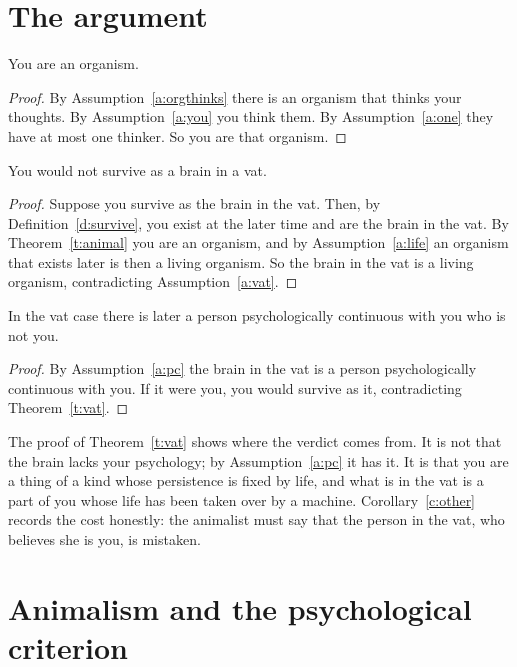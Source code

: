 \documentclass{situationist-preprint}
\begin{document}
\section{The argument}\label{s:arg}

\begin{theorem}\label{t:animal}
You are an organism.
\end{theorem}

\begin{proof}
By Assumption~\ref{a:orgthinks} there is an organism that thinks your thoughts. By Assumption~\ref{a:you} you think them. By Assumption~\ref{a:one} they have at most one thinker. So you are that organism.
\end{proof}

\begin{theorem}\label{t:vat}
You would not survive as a brain in a vat.
\end{theorem}

\begin{proof}
Suppose you survive as the brain in the vat. Then, by Definition~\ref{d:survive}, you exist at the later time and are the brain in the vat. By Theorem~\ref{t:animal} you are an organism, and by Assumption~\ref{a:life} an organism that exists later is then a living organism. So the brain in the vat is a living organism, contradicting Assumption~\ref{a:vat}.
\end{proof}

\begin{corollary}\label{c:other}
In the vat case there is later a person psychologically continuous with you who is not you.
\end{corollary}

\begin{proof}
By Assumption~\ref{a:pc} the brain in the vat is a person psychologically continuous with you. If it were you, you would survive as it, contradicting Theorem~\ref{t:vat}.
\end{proof}

The proof of Theorem~\ref{t:vat} shows where the verdict comes from. It is not that the brain lacks your psychology; by Assumption~\ref{a:pc} it has it. It is that you are a thing of a kind whose persistence is fixed by life, and what is in the vat is a part of you whose life has been taken over by a machine. Corollary~\ref{c:other} records the cost honestly: the animalist must say that the person in the vat, who believes she is you, is mistaken.

\section{Animalism and the psychological criterion}\label{s:recon}
\end{document}
